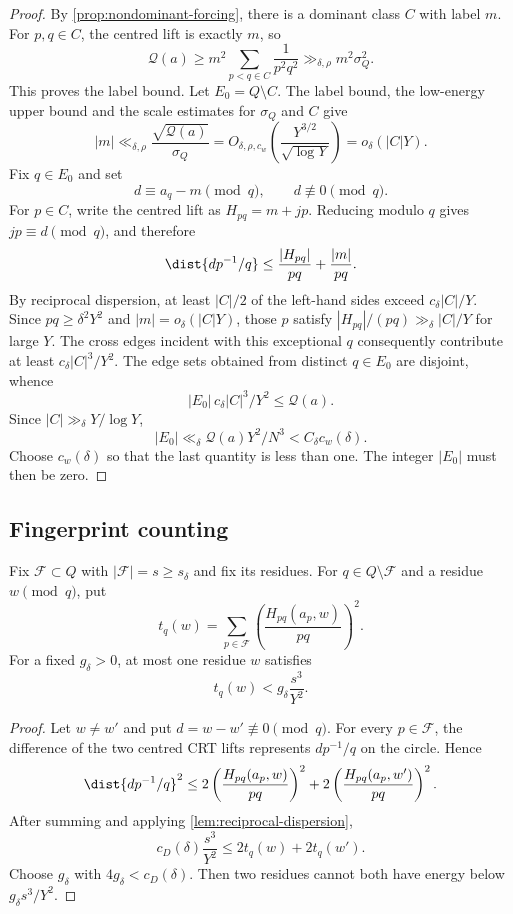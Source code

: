 \begin{proof}
By \cref{prop:nondominant-forcing}, there is a dominant class $C$ with label $m$.  For $p,q\in C$, the centred lift is exactly $m$, so
\[
 \mathcal Q(a)
 \geq m^2\sum_{p<q\in C}\frac1{p^2q^2}
 \gg_{\delta,\rho}m^2\sigma_Q^2.
\]
This proves the label bound.  Let $E_0=Q\setminus C$.  The label bound, the low-energy upper bound and the scale estimates for $\sigma_Q$ and $C$ give
\[
 |m|
 \ll_{\delta,\rho}\frac{\sqrt{\mathcal Q(a)}}{\sigma_Q}
 =O_{\delta,\rho,c_w}\!\left(\frac{Y^{3/2}}{\sqrt{\log Y}}\right)
 =o_\delta(|C|Y).
\]
Fix $q\in E_0$ and set
\[
 d\equiv a_q-m\pmod q,
 \qquad d\not\equiv0\pmod q.
\]
For $p\in C$, write the centred lift as $H_{pq}=m+jp$.  Reducing modulo $q$ gives $jp\equiv d\pmod q$, and therefore
\[
 \dist{dp^{-1}/q}
 \leq \frac{|H_{pq}|}{pq}+\frac{|m|}{pq}.
\]
By reciprocal dispersion, at least $|C|/2$ of the left-hand sides exceed $c_\delta|C|/Y$.  Since $pq\geq\delta^2Y^2$ and $|m|=o_\delta(|C|Y)$, those $p$ satisfy $|H_{pq}|/(pq)\gg_\delta |C|/Y$ for large $Y$.  The cross edges incident with this exceptional $q$ consequently contribute at least $c_\delta|C|^3/Y^2$.  The edge sets obtained from distinct $q\in E_0$ are disjoint, whence
\[
 |E_0|\,c_\delta|C|^3/Y^2\leq\mathcal Q(a).
\]
Since $|C|\gg_\delta Y/\log Y$,
\[
 |E_0|\ll_\delta\mathcal Q(a)Y^2/N^3<C_\delta c_w(\delta).
\]
Choose $c_w(\delta)$ so that the last quantity is less than one.  The integer $|E_0|$ must then be zero.
\end{proof}

\subsection{Fingerprint counting}

\begin{lemma}
\label{lem:fingerprint-rigidity}
Fix $\mathcal F\subset Q$ with $|\mathcal F|=s\geq s_\delta$ and fix its residues.  For $q\in Q\setminus\mathcal F$ and a residue $w\pmod q$, put
\[
 t_q(w)=\sum_{p\in\mathcal F}
 \left(\frac{H_{pq}(a_p,w)}{pq}\right)^2.
\]
For a fixed $g_\delta>0$, at most one residue $w$ satisfies
\[
 t_q(w)<g_\delta\frac{s^3}{Y^2}.
\]
\end{lemma}

\begin{proof}
Let $w\neq w'$ and put $d=w-w'\not\equiv0\pmod q$.  For every $p\in\mathcal F$, the difference of the two centred CRT lifts represents $dp^{-1}/q$ on the circle.  Hence
\[
 \dist{dp^{-1}/q}^2
 \leq2\left(\frac{H_{pq}(a_p,w)}{pq}\right)^2
  +2\left(\frac{H_{pq}(a_p,w')}{pq}\right)^2.
\]
After summing and applying \cref{lem:reciprocal-dispersion},
\[
 c_D(\delta)\frac{s^3}{Y^2}
 \leq2t_q(w)+2t_q(w').
\]
Choose $g_\delta$ with $4g_\delta<c_D(\delta)$.  Then two residues cannot both have energy below $g_\delta s^3/Y^2$.
\end{proof}

